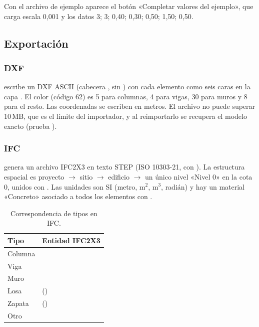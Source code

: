 Con el archivo de ejemplo  aparece el botón «Completar valores del ejemplo», que
carga escala 0,001 y los datos 3; 3; 0,40; 0,30; 0,50; 1,50; 0,50.

\subsection{Exportación}
\label{sec:mod-exportacion}

\subsubsection{DXF}

 escribe un DXF ASCII (cabecera , sin
) con cada elemento como seis caras  en la capa .
El color (código 62) es 5 para columnas, 4 para vigas, 30 para muros y 8 para el resto. Las coordenadas se escriben en
metros. El archivo no puede superar 10\,MB, que es el límite del importador, y al reimportarlo se recupera el modelo
exacto (prueba ).

\subsubsection{IFC}

 genera un archivo IFC2X3 en texto STEP
(ISO 10303-21,  con ). La estructura espacial es
proyecto $\rightarrow$ sitio $\rightarrow$ edificio $\rightarrow$ un único nivel «Nivel 0» en la cota 0, unidos con
. Las unidades son SI (metro, m$^2$, m$^3$, radián) y hay un material «Concreto» asociado a
todos los elementos con .

\begin{table}[H]
	\centering
	\caption{Correspondencia de tipos en IFC.}
	\label{tab:mod-ifc}
	\begin{tabular}{L{2.6cm}L{6cm}}
		\hline
		\textbf{Tipo} & \textbf{Entidad IFC2X3} \\ \hline
		Columna &  \\
		Viga &  \\
		Muro &  \\
		Losa &  () \\
		Zapata &  () \\
		Otro &  \\
		\hline
	\end{tabular}
\end{table}

